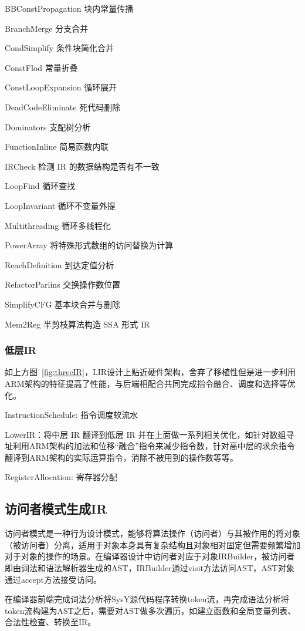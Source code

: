 BBConstPropagation   块内常量传播

BranchMerge  分支合并

CondSimplify  条件块简化合并

ConstFlod  常量折叠

ConstLoopExpansion  循环展开

DeadCodeEliminate  死代码删除

Dominators  支配树分析

FunctionInline  简易函数内联

IRCheck  检测 IR 的数据结构是否有不一致

LoopFind  循环查找

LoopInvariant  循环不变量外提

Multithreading   循环多线程化

PowerArray  将特殊形式数组的访问替换为计算

ReachDefinition  到达定值分析

RefactorParlins  交换操作数位置

SimplifyCFG  基本块合并与删除

Mem2Reg  半剪枝算法构造 SSA 形式 IR


\subsubsection{低层IR}

如上方图~\ref{fig:threeIR}，LIR设计上贴近硬件架构，舍弃了移植性但是进一步利用ARM架构的特征提高了性能，与后端相配合共同完成指令融合、调度和选择等优化。

InstructionSchedule: 指令调度软流水

LowerIR：将中层 IR 翻译到低层 IR 并在上面做一系列相关优化，如针对数组寻址利用ARM架构的加法和位移“融合”指令来减少指令数，针对高中层的求余指令翻译到ARM架构的实际运算指令，消除不被用到的操作数等等。

RegisterAllocation: 寄存器分配

\subsection{访问者模式生成IR}

访问者模式是一种行为设计模式，能够将算法操作（访问者）与其被作用的将对象（被访问者）分离，适用于对象本身具有复杂结构且对象相对固定但需要频繁增加对于对象的操作的场景。在编译器设计中访问者对应于对象IRBuilder，被访问者即由词法和语法解析器生成的AST，IRBuilder通过visit方法访问AST，AST对象通过accept方法接受访问。 

在编译器前端完成词法分析将SysY源代码程序转换token流，再完成语法分析将token流构建为AST之后，需要对AST做多次遍历，如建立函数和全局变量列表、合法性检查、转换至IR。

